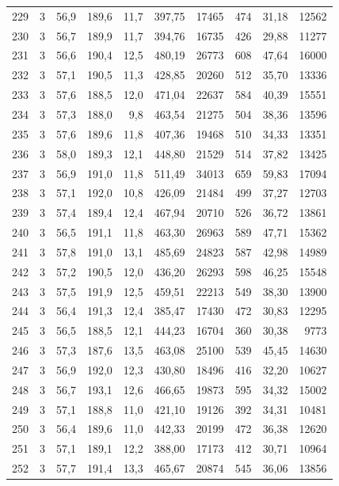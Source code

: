 \documentclass[11pt,a4paper]{article}
\begin{document}
{\begin{longtable}{r c r r r r r r r r}
229 & 3 & 56,9 & 189,6 & 11,7 & 397,75 & 17465 & 474 & 31,18 & 12562 \\
230 & 3 & 56,7 & 189,9 & 11,7 & 394,76 & 16735 & 426 & 29,88 & 11277 \\
231 & 3 & 56,6 & 190,4 & 12,5 & 480,19 & 26773 & 608 & 47,64 & 16000 \\
232 & 3 & 57,1 & 190,5 & 11,3 & 428,85 & 20260 & 512 & 35,70 & 13336 \\
233 & 3 & 57,6 & 188,5 & 12,0 & 471,04 & 22637 & 584 & 40,39 & 15551 \\
234 & 3 & 57,3 & 188,0 & 9,8 & 463,54 & 21275 & 504 & 38,36 & 13596 \\
235 & 3 & 57,6 & 189,6 & 11,8 & 407,36 & 19468 & 510 & 34,33 & 13351 \\
236 & 3 & 58,0 & 189,3 & 12,1 & 448,80 & 21529 & 514 & 37,82 & 13425 \\
237 & 3 & 56,9 & 191,0 & 11,8 & 511,49 & 34013 & 659 & 59,83 & 17094 \\
238 & 3 & 57,1 & 192,0 & 10,8 & 426,09 & 21484 & 499 & 37,27 & 12703 \\
239 & 3 & 57,4 & 189,4 & 12,4 & 467,94 & 20710 & 526 & 36,72 & 13861 \\
240 & 3 & 56,5 & 191,1 & 11,8 & 463,30 & 26963 & 589 & 47,71 & 15362 \\
241 & 3 & 57,8 & 191,0 & 13,1 & 485,69 & 24823 & 587 & 42,98 & 14989 \\
242 & 3 & 57,2 & 190,5 & 12,0 & 436,20 & 26293 & 598 & 46,25 & 15548 \\
243 & 3 & 57,5 & 191,9 & 12,5 & 459,51 & 22213 & 549 & 38,30 & 13900 \\
244 & 3 & 56,4 & 191,3 & 12,4 & 385,47 & 17430 & 472 & 30,83 & 12295 \\
245 & 3 & 56,5 & 188,5 & 12,1 & 444,23 & 16704 & 360 & 30,38 & 9773 \\
246 & 3 & 57,3 & 187,6 & 13,5 & 463,08 & 25100 & 539 & 45,45 & 14630 \\
247 & 3 & 56,9 & 192,0 & 12,3 & 430,80 & 18496 & 416 & 32,20 & 10627 \\
248 & 3 & 56,7 & 193,1 & 12,6 & 466,65 & 19873 & 595 & 34,32 & 15002 \\
249 & 3 & 57,1 & 188,8 & 11,0 & 421,10 & 19126 & 392 & 34,31 & 10481 \\
250 & 3 & 56,4 & 189,6 & 11,0 & 442,33 & 20199 & 472 & 36,38 & 12620 \\
251 & 3 & 57,1 & 189,1 & 12,2 & 388,00 & 17173 & 412 & 30,71 & 10964 \\
252 & 3 & 57,7 & 191,4 & 13,3 & 465,67 & 20874 & 545 & 36,06 & 13856 \\

\end{longtable}}
\end{document}
